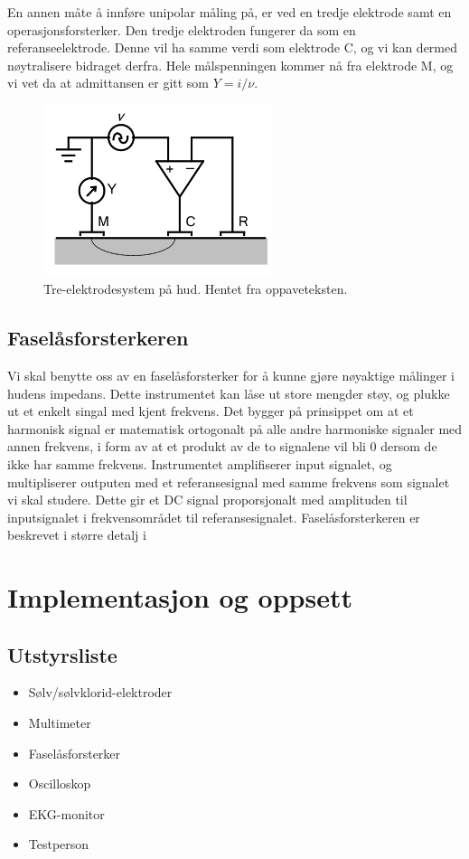 \documentclass[11pt,norsk]{article}
\begin{document}
En annen måte å innføre unipolar måling på, er ved en tredje elektrode samt en operasjonsforsterker. Den tredje elektroden fungerer da som en referanseelektrode. Denne vil ha samme verdi som elektrode C, og vi kan dermed nøytralisere bidraget derfra. Hele målspenningen kommer nå fra elektrode M, og vi vet da at admittansen er gitt som $ Y = i/\nu$. 

\begin{figure}[H]
\centering
\includegraphics[width = 0.6\textwidth]{fig/screenshot2.png}
\caption{ Tre-elektrodesystem på hud. Hentet fra oppaveteksten.}
\end{figure}

\subsection{Faselåsforsterkeren}
Vi skal benytte oss av en faselåsforsterker for å kunne gjøre nøyaktige målinger i hudens impedans. Dette instrumentet kan låse ut store mengder støy, og plukke ut et enkelt singal med kjent frekvens. Det bygger på prinsippet om at et harmonisk signal er matematisk ortogonalt på alle andre harmoniske signaler med annen frekvens, i form av at et produkt av de to signalene vil bli 0 dersom de ikke har samme frekvens. Instrumentet amplifiserer input signalet, og multipliserer outputen med et referansesignal med samme frekvens som signalet vi skal studere. Dette gir et DC signal proporsjonalt med amplituden til inputsignalet i frekvensområdet til referansesignalet. Faselåsforsterkeren er beskrevet i større detalj i \cite{SR830}



\section{Implementasjon og oppsett}

\subsection{Utstyrsliste}
\begin{itemize}
\item Sølv/sølvklorid-elektroder
\item Multimeter
\item Faselåsforsterker
\item Oscilloskop
\item EKG-monitor
\item Testperson
\end{itemize}
\end{document}

